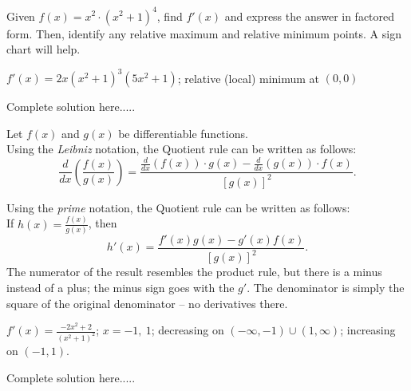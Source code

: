\begin{example}
Given $f(x)=x^2\cdot (x^2+1)^4$, find $f'(x)$ and express the answer in factored form. Then, identify any relative maximum and relative minimum points. A sign chart will help. 
    \begin{sol}
    $f'(x)=2x(x^2+1)^3(5x^2+1)$; relative (local) minimum at $(0,0)$
    \end{sol}
    \begin{solL}
    Complete solution here.....
    
    \end{solL}
    
\end{example}
\begin{tcolorbox}[title = {Quotien Rule}]

\noindent Let $f(x)$ and $g(x)$ be differentiable functions. \\

Using the \emph{Leibniz} notation, the Quotient rule can be written as follows: 
\begin{equation}\label{eq:quotientRuleLeibniz}
\frac{d}{dx}\left(\frac{f(x)}{g(x)}\right)=\frac{\frac{d}{dx}(f(x))\cdot g(x)-\frac{d}{dx}(g(x))\cdot f(x)}{[g(x)]^2}.
\end{equation}

Using the \emph{prime} notation, the Quotient rule can be written as follows: \\

If $h(x)=\displaystyle\frac{f(x)}{g(x)}$, then
\begin{equation}\label{eq:quotientRulePrime}
h'(x)=\frac{f'(x)g(x)-g'(x)f(x)}{[g(x)]^2}.                                                     
\end{equation}
The numerator of the result resembles the product rule, but there is a minus instead of a plus; the minus sign goes with the $g'$. The denominator is simply the square of the original denominator – no derivatives there.
\end{tcolorbox}
\begin{example}
    \begin{sol}
    $f'(x)=\displaystyle\frac{-2x^2+2}{(x^2+1)^2}$; $x=-1,\ 1$; decreasing on $(-\infty,-1)\cup (1,\infty)$; increasing on $(-1,1)$.
    \end{sol}
    \begin{solL}
    Complete solution here.....
    
    \end{solL}
    
\end{example}
